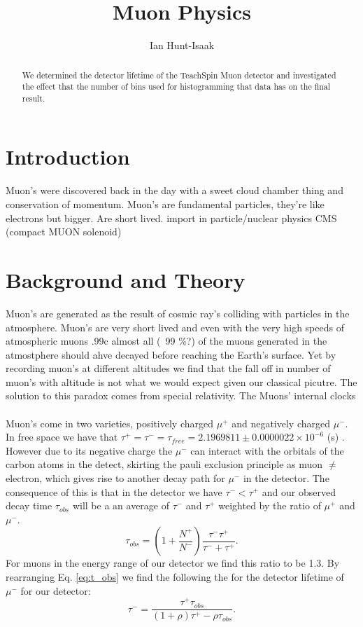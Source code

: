 \documentclass[11pt,letterpaper]{article}
\title{Muon Physics}
\date{}
\author{Ian Hunt-Isaak}
\begin{document}
\maketitle
\begin{abstract}
We determined the detector lifetime of the TeachSpin Muon detector and investigated the effect that the number of bins used for histogramming that data has on the final result.
\end{abstract}
\section{Introduction}
Muon's were discovered back in the day with a sweet cloud chamber thing and conservation of momentum. Muon's are fundamental particles, they're like electrons but bigger. Are short lived. import in particle/nuclear physics CMS (compact MUON solenoid) 
\section{Background and Theory}
Muon's are generated as the result of cosmic ray's colliding with particles in the atmosphere. Muon's are very short lived and even with the very high speeds of atmospheric muons .99c almost all (~99 \%?) of the muons generated in the atmostphere should ahve decayed before reaching the Earth's surface. Yet by recording muon's at different altitudes we find that the fall off in number of muon's with altitude is not what we would expect given our classical picutre. The solution to this paradox comes from special relativity. The Muons' internal clocks \\ \\

Muon's come in two varieties, positively charged $\mu^+$ and negatively charged $\mu^-$. In free space we have that $\tau^+ = \tau^- = \tau_{free} = 2.1969811 \pm 0.0000022 × 10^{-6}$ (s) \cite{PDG}. However due to its negative charge the $\mu^-$ can interact with the orbitals of the carbon atoms in the detect, skirting the pauli exclusion principle as muon $\ne$ electron, which gives rise to another decay path for $\mu^-$ in the detector. The consequence of this is that in the detector we have $\tau^- < \tau^+$ and our observed decay time $\tau_{obs}$ will be a an average of $\tau^-$ and  $\tau^+$ weighted by the ratio of $\mu^+$ and $\mu^-$.
\begin{equation}
 \label{eq:t_obs}
     \tau_{obs} = \left(1+\frac{N^+}{N^-}\right)\frac{\tau^-\tau^+}{\tau^-+\tau^+}.
\end{equation}
For muons in the energy range of our detector we find this ratio to be 1.3\cite{ChargeRatio}. By rearranging Eq. \ref{eq:t_obs} we find the following the for the detector lifetime of $\mu^-$ for our detector:
\begin{equation}
\label{eq:t_minus}
\tau^- = \frac{\tau^+\tau_{obs}}{\left(1+\rho\right)\tau^+-\rho\tau_{obs}}.
\end{equation}
\end{document}
